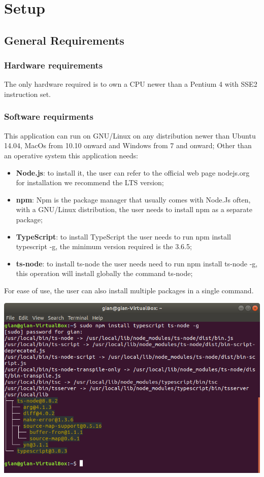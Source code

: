 \section{Setup}
\subsection{General Requirements}
\subsubsection{Hardware requirements}
The only hardware required is to own a CPU newer than a Pentium 4 with SSE2 instruction set.
\subsubsection{Software requirments}
This application can run on GNU/Linux on any distribution newer than Ubuntu 14.04, MacOs from 10.10 onward and Windows from 7 and onward;
Other than an operative system this application needs:
\begin{itemize}
    \item \textbf{Node.js}: to install it, the user can refer to the official web page nodejs.org for installation we recommend the LTS version;
    \item \textbf{npm}: Npm is the package manager that usually comes with Node.Js often, with a GNU/Linux distribution, the user needs to install npm as a separate package;
    \item \textbf{TypeScript}: to install TypeScript the user needs to run npm install typescript -g, the minimum version required is the 3.6.5;
    \item \textbf{ts-node}: to install ts-node the user needs need to run npm install ts-node -g, this operation will install globally the command ts-node;
\end{itemize}
For ease of use, the user can also install multiple packages in a single command.
\begin{center}
\end{center}
\includegraphics[width=\textwidth]{res/img/typescriptInstall.png}    


